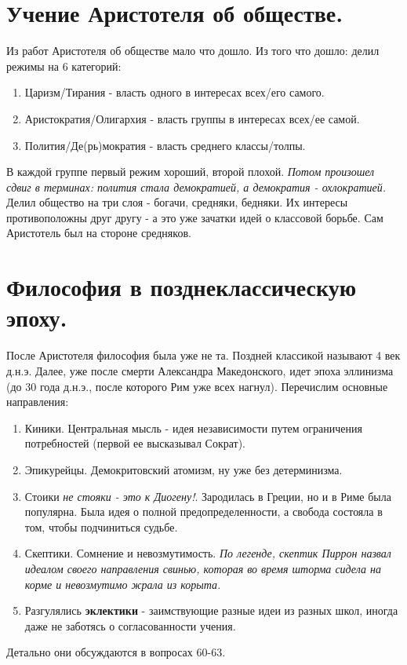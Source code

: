 \documentclass[12pt,a4paper]{article}
\begin{document}
\section{Учение Аристотеля об обществе.}
Из работ Аристотеля об обществе мало что дошло. Из того что дошло: делил режимы на 6 категорий:
\begin{enumerate}
\item Царизм/Тирания - власть одного в интересах всех/его самого.
\item Аристократия/Олигархия - власть группы в интересах всех/ее самой.
\item Полития/Де(рь)мократия  - власть среднего классы/толпы.
\end{enumerate}
В каждой группе первый режим хороший, второй плохой. \textit{Потом произошел сдвиг в терминах: полития стала демократией, а демократия - охлократией.}
Делил общество на три слоя - богачи, средняки, бедняки. Их интересы противоположны друг другу - а это уже зачатки идей о классовой борьбе. Сам Аристотель был на стороне средняков.

\section{Философия в позднеклассическую эпоху.}
После Аристотеля философия была уже не та. Поздней классикой называют 4 век д.н.э. Далее, уже после смерти Александра Македонского, идет эпоха эллинизма (до 30 года д.н.э., после которого Рим уже всех нагнул). Перечислим основные направления:
\begin{enumerate}
\item Киники. Центральная мысль - идея независимости путем ограничения потребностей (первой ее высказывал Сократ).
\item Эпикурейцы. Демокритовский атомизм, ну уже без детерминизма.
\item Стоики \textit{не стояки - это к Диогену!}. Зародилась в Греции, но и в Риме была популярна. Была идея о полной предопределенности, а свобода состояла в том, чтобы подчиниться судьбе.
\item Скептики. Сомнение и невозмутимость. \textit{По легенде, скептик Пиррон назвал идеалом своего направления свинью, которая во время шторма сидела на корме и невозмутимо жрала из корыта.}
\item Разгулялись \textbf{эклектики}  - заимствующие разные идеи из разных школ, иногда даже не заботясь о согласованности учения.
\end{enumerate}
Детально они обсуждаются в вопросах 60-63.
\end{document}
